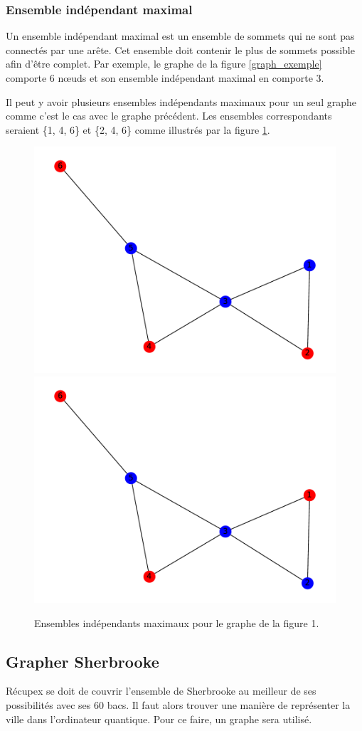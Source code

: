 \documentclass[11pt]{article}
\begin{document}
\subsubsection{Ensemble indépendant maximal}
Un ensemble indépendant maximal est un ensemble de sommets qui ne sont pas connectés par une arête. Cet ensemble doit contenir le plus de sommets possible afin d'être complet. Par exemple, le graphe de la figure \ref{graph_exemple} comporte 6 nœuds et son ensemble indépendant maximal en comporte 3.
 
Il peut y avoir plusieurs ensembles indépendants maximaux pour un seul graphe comme c'est le cas avec le graphe précédent. Les ensembles correspondants seraient \{1, 4, 6\} et \{2, 4, 6\} comme illustrés par la figure \ref{MIS_exemple}.

\begin{figure}[H]
    \centering
    \includegraphics[width=0.4\linewidth]{images/graphe_MIS_1.pdf}
    \includegraphics[width=0.4\linewidth]{images/graphe_MIS_2.pdf}
    \caption{Ensembles indépendants maximaux pour le graphe de la figure 1.}
    \label{MIS_exemple}
\end{figure}



\subsection{Grapher Sherbrooke}
Récupex se doit de couvrir l'ensemble de Sherbrooke au meilleur de ses possibilités avec ses 60 bacs. Il faut alors trouver une manière de représenter la ville dans l'ordinateur quantique. Pour ce faire, un graphe sera utilisé. 
\end{document}
